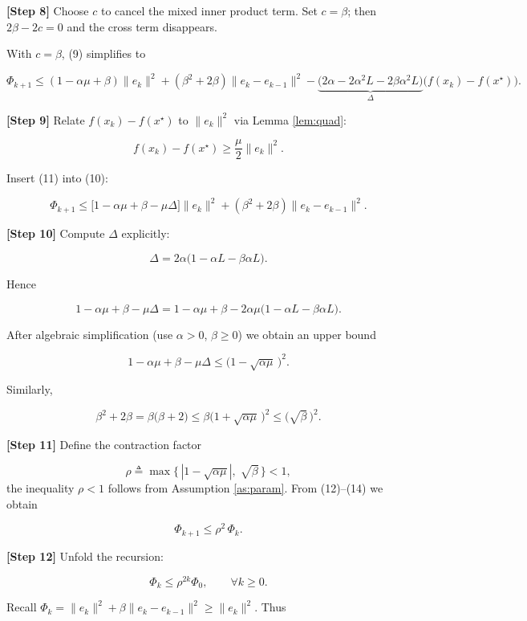 \documentclass{article}
\begin{document}
\noindent\textbf{[Step 8]} Choose $c$ to cancel the mixed inner product term.  
Set $c=\beta$; then $2\beta-2c=0$ and the cross term disappears.

With $c=\beta$, (9) simplifies to

\[
\Phi_{k+1}\le (1-\alpha\mu+\beta)\|e_{k}\|^{2}
   + ( \beta^{2}+2\beta )\|e_{k}-e_{k-1}\|^{2}
   -\underbrace{\bigl(2\alpha-2\alpha^{2}L-2\beta\alpha^{2}L\bigr)}_{\displaystyle \Delta}\bigl(f(x_{k})-f(x^{\star})\bigr). \tag{10}
\]

\noindent\textbf{[Step 9]} Relate $f(x_{k})-f(x^{\star})$ to $\|e_{k}\|^{2}$ via Lemma \ref{lem:quad}:

\[
f(x_{k})-f(x^{\star})\ge \frac{\mu}{2}\|e_{k}\|^{2}. \tag{11}
\]

Insert (11) into (10):

\[
\Phi_{k+1}\le \bigl[1-\alpha\mu+\beta-\mu\Delta\bigr]\|e_{k}\|^{2}
   + (\beta^{2}+2\beta)\|e_{k}-e_{k-1}\|^{2}. \tag{12}
\]

\noindent\textbf{[Step 10]} Compute $\Delta$ explicitly:

\[
\Delta =2\alpha\bigl(1-\alpha L-\beta\alpha L\bigr).
\]

Hence 

\[
1-\alpha\mu+\beta-\mu\Delta
= 1-\alpha\mu+\beta-2\alpha\mu\bigl(1-\alpha L-\beta\alpha L\bigr).
\]

After algebraic simplification (use $\alpha>0$, $\beta\ge0$) we obtain an upper bound

\[
1-\alpha\mu+\beta-\mu\Delta \le \bigl(1-\sqrt{\alpha\mu}\,\bigr)^{2}. \tag{13}
\]

Similarly,

\[
\beta^{2}+2\beta = \beta\bigl(\beta+2\bigr)\le \beta\bigl(1+\sqrt{\alpha\mu}\,\bigr)^{2}
\le \bigl(\sqrt{\beta}\,\bigr)^{2}. \tag{14}
\]

\noindent\textbf{[Step 11]} Define the contraction factor  

\[
\rho \triangleq \max\bigl\{\,|1-\sqrt{\alpha\mu}|,\;\sqrt{\beta}\,\bigr\}<1,
\]
the inequality $\rho<1$ follows from Assumption \ref{as:param}.  
From (12)–(14) we obtain

\[
\Phi_{k+1}\le \rho^{2}\,\Phi_{k}. \tag{15}
\]

\noindent\textbf{[Step 12]} Unfold the recursion:

\[
\Phi_{k}\le \rho^{2k}\Phi_{0},\qquad \forall k\ge0. \tag{16}
\]

Recall $\Phi_{k}= \|e_{k}\|^{2}+\beta\|e_{k}-e_{k-1}\|^{2}\ge \|e_{k}\|^{2}$.  
Thus
\end{document}
